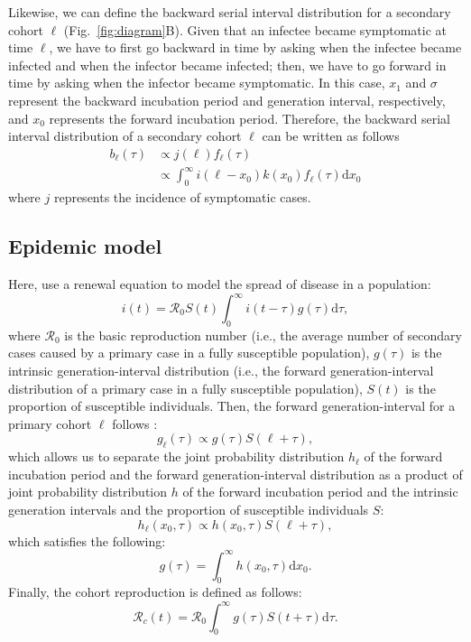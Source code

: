 \documentclass[12pt]{article}
\newcommand{\fref}[1]{Fig.~\ref{fig:#1}}
\begin{document}
Likewise, we can define the backward serial interval distribution for a secondary cohort $\ell$ (\fref{diagram}B).
Given that an infectee became symptomatic at time $\ell$, we have to first go backward in time by asking when the infectee became infected and when the infector became infected; 
then, we have to go forward in time by asking when the infector became symptomatic.
In this case, $x_1$ and $\sigma$ represent the backward incubation period and generation interval, respectively, and $x_0$ represents the forward incubation period.
Therefore, the backward serial interval distribution of a secondary cohort $\ell$ can be written as follows
\begin{equation}
\begin{aligned}
b_\ell(\tau) &\propto j(\ell) f_{\ell}(\tau)\\
&\propto \int_0^\infty i(\ell-x_0) k(x_0) f_{\ell}(\tau) \mathrm{d} x_0
\end{aligned}
\end{equation}
where $j$ represents the incidence of symptomatic cases.

\subsection{Epidemic model}

Here, use a renewal equation to model the spread of disease in a population:
\begin{equation}
i(t) = \mathcal R_0 S(t) \int_0^\infty i(t-\tau) g(\tau) \mathrm{d}\tau,
\label{eq:renewal}
\end{equation}
where $\mathcal R_0$ is the basic reproduction number (i.e., the average number of secondary cases caused by a primary case  in a fully susceptible population), $g(\tau)$ is the intrinsic generation-interval distribution (i.e., the forward generation-interval distribution of a primary case in a fully susceptible population), $S(t)$ is the proportion of susceptible individuals.
Then, the forward generation-interval for a primary cohort $\ell$ follows \citep{champredon2015intrinsic}:
\begin{equation}
g_\ell (\tau) \propto g(\tau) S(\ell + \tau),
\end{equation}
which allows us to separate the joint probability distribution $h_\ell$ of the forward incubation period and the forward generation-interval distribution as a product of joint probability distribution $h$ of the forward incubation period and the intrinsic generation intervals and the proportion of susceptible individuals $S$:
\begin{equation}
h_\ell (x_0, \tau) \propto h(x_0, \tau) S(\ell + \tau),
\end{equation}
which satisfies the following:
\begin{equation}
g(\tau) = \int_0^\infty h(x_0, \tau) \mathrm{d}x_0.
\end{equation}
Finally, the cohort reproduction is defined as follows:
\begin{equation}
\mathcal R_c(t) = \mathcal R_0 \int_0^\infty g(\tau) S(t+\tau) \mathrm{d} \tau.
\end{equation}
\end{document}
